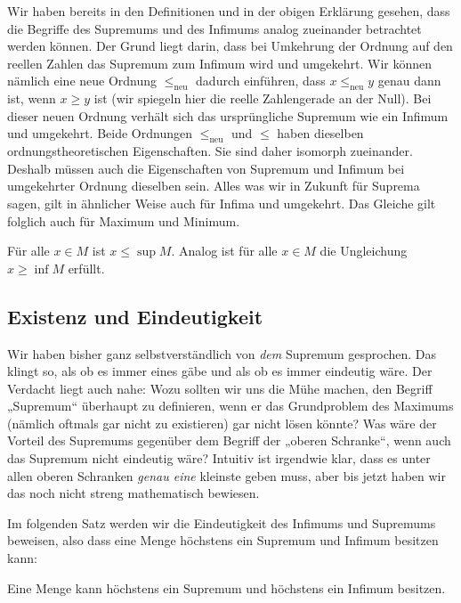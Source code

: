 \documentclass[fontsize=9pt,
               parskip=half-,
               DIV=14,
               listof=chapterentry,
               tocflat]{scrbook}
\begin{document}
Wir haben bereits in den Definitionen und in der obigen Erklärung gesehen, dass die Begriffe des Supremums und des Infimums analog zueinander betrachtet werden können. Der Grund liegt darin, dass bei Umkehrung der Ordnung auf den reellen Zahlen das Supremum zum Infimum wird und umgekehrt. Wir können nämlich eine neue Ordnung $\leq _{\text{neu}}$ dadurch einführen, dass $x\leq _{\text{neu}}y$ genau dann ist, wenn $x\geq y$ ist (wir spiegeln hier die reelle Zahlengerade an der Null). Bei dieser neuen Ordnung verhält sich das ursprüngliche Supremum wie ein Infimum und umgekehrt. Beide Ordnungen $\leq _{\text{neu}}$ und $\leq $ haben dieselben ordnungstheoretischen Eigenschaften. Sie sind daher isomorph zueinander. Deshalb müssen auch die Eigenschaften von Supremum und Infimum bei umgekehrter Ordnung dieselben sein. Alles was wir in Zukunft für Suprema sagen, gilt in ähnlicher Weise auch für Infima und umgekehrt. Das Gleiche gilt folglich auch für Maximum und Minimum.

\begin{example*}[Dualitätsprinzip]
Für alle $x\in M$ ist $x\leq \sup M$. Analog ist für alle $x\in M$ die Ungleichung $x\geq \inf M$ erfüllt.

\end{example*}

\subsection{Existenz und Eindeutigkeit}

Wir haben bisher ganz selbstverständlich von \emph{dem} Supremum gesprochen. Das klingt so, als ob es immer eines gäbe und als ob es immer eindeutig wäre. Der Verdacht liegt auch nahe: Wozu sollten wir uns die Mühe machen, den Begriff „Supremum“ überhaupt zu definieren, wenn er das Grundproblem des Maximums (nämlich oftmals gar nicht zu existieren) gar nicht lösen könnte? Was wäre der Vorteil des Supremums gegenüber dem Begriff der „oberen Schranke“, wenn auch das Supremum nicht eindeutig wäre? Intuitiv ist irgendwie klar, dass es unter allen oberen Schranken \emph{genau eine} kleinste geben muss, aber bis jetzt haben wir das noch nicht streng mathematisch bewiesen.

Im folgenden Satz werden wir die Eindeutigkeit des Infimums und Supremums beweisen, also dass eine Menge höchstens ein Supremum und Infimum besitzen kann:

\begin{theorem*}
Eine Menge kann höchstens ein Supremum und höchstens ein Infimum besitzen.

\end{theorem*}
\end{document}
